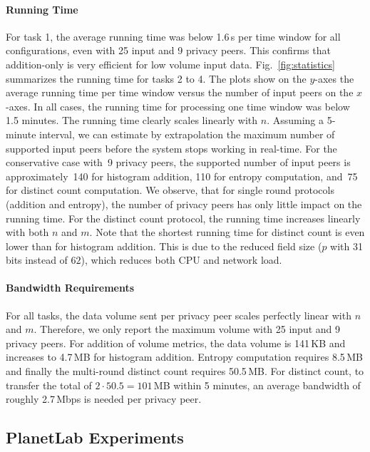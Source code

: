 \documentclass[letterpaper,11pt,onecolumn,titlepage]{article}
\begin{document}
\paragraph{Running Time}
For task 1, the average running time was below 1.6\,s per time window for
all configurations, even with 25 input and 9 privacy peers. This confirms
that addition-only is very efficient for low volume input data.
Fig.~\ref{fig:statistics} summarizes the running time for tasks 2 to 4. The
plots show on the $y$-axes the average running time per
time window versus the number of input peers on the $x$-axes. 
In all cases, the running time for processing one
time window was below 1.5 minutes.
The running time clearly scales linearly with
$n$. Assuming a 5-minute interval, we can estimate by
extrapolation the maximum number of supported input peers before the system
stops working in real-time. For the conservative case with~9
privacy peers, the supported number of input peers is approximately~140 for histogram addition,
110 for entropy computation, and~75 for distinct count computation.
We observe, that for single round protocols (addition and entropy),  
the number of privacy peers has only little impact on the running time. 
For the distinct count protocol, the running time increases linearly with both $n$ and $m$. 
Note that the shortest running time for distinct count is even lower than for histogram
addition. This is due to the reduced field size ($p$ with 31 bits instead of $62$), which reduces both CPU and network
load.

\paragraph{Bandwidth Requirements}
For all tasks, the data volume sent per privacy peer scales perfectly linear
with $n$ and $m$. Therefore, we only report the maximum volume
with 25 input and 9 privacy peers. For addition of volume metrics, the data volume is 141\,KB and increases
to 4.7\,MB for histogram addition. Entropy computation requires 8.5\,MB and finally the multi-round distinct
count requires 50.5\,MB. For distinct count, to transfer the total of $2 \cdot 50.5=101$\,MB within
5 minutes, an average bandwidth of roughly 2.7\,Mbps is needed per privacy peer.


\subsection{PlanetLab Experiments}
\label{sec:eval_planetlab}
\end{document}
